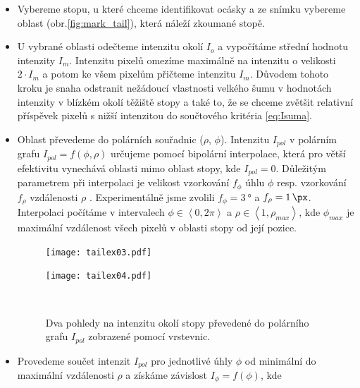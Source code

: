 	\begin{itemize}
	\item Vybereme stopu, u které chceme identifikovat ocásky a ze snímku vybereme oblast (obr.\ref{fig:mark_tail}), která náleží zkoumané stopě. 
	
	\item U vybrané oblasti odečteme intenzitu okolí $I_o$ a vypočítáme střední hodnotu intenzity $I_m$. Intenzitu pixelů omezíme maximálně na intenzitu o velikosti $2\cdot I_m$ a potom ke všem pixelům přičteme intenzitu $I_m$. Důvodem tohoto kroku je snaha odstranit nežádoucí vlastnosti velkého šumu v hodnotách intenzity v blízkém okolí těžiště stopy a také to, že se chceme zvětšit relativní příspěvek pixelů s nižší intenzitou do součtového kritéria \ref{eq:Isuma}.   
	
	\item Oblast převedeme do polárních souřadnic ($\rho$, $\phi$). Intenzitu $I_{pol}$ v polárním grafu $I_{pol} = f(\phi,\rho)$ určujeme pomocí bipolární interpolace, která pro větší efektivitu vynechává oblasti mimo oblast stopy, kde $I_{pol} = 0$. Důležitým parametrem při interpolaci je velikost vzorkování $f_{\phi}$ úhlu $\phi$ resp. vzorkování $f_{\rho}$ vzdálenosti $\rho$ . Experimentálně jsme zvolili $f_{\phi} = \SI{3}{\degree}$ a $f_{\rho} = \SI{1}{\px}$. Interpolaci počítáme v intervalech  $\phi \in \left\langle 0,2\pi \right\rangle$ a $\rho \in \left\langle 1,\rho_{max} \right\rangle$, kde $\phi_{max}$ je maximální vzdálenost všech pixelů v oblasti stopy od její pozice.  
	
	\begin{figure}[htps]
    \centering
    \begin{minipage}[c]{0.48\textwidth}
        \centering\texttt{[image: tailex03.pdf]}
    \end{minipage}
    \begin{minipage}[c]{0.48\textwidth}
        \centering\texttt{[image: tailex04.pdf]}
    \end{minipage}
    \\
        \caption[Detektor ocásků - polární graf.]{Dva pohledy na intenzitu okolí stopy převedené do polárního grafu $I_{pol}$ zobrazené pomocí vrstevnic.}
        \label{Detekce}
\end{figure}
	
	\item Provedeme součet intenzit $I_{pol}$ pro jednotlivé úhly $\phi$ od minimální do maximální vzdálenosti $\rho$ a získáme závislost $I_\phi = f(\phi)$, kde  
	

\end{itemize}
